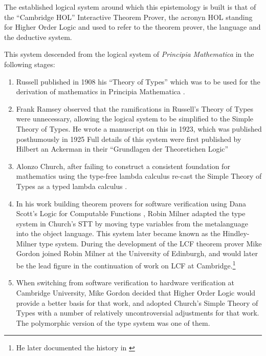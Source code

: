 \documentclass[10pt,titlepage]{book}
\begin{document}
The established logical system around which this epistemology is built is that of the ``Cambridge HOL'' Interactive Theorem Prover, the acronyn HOL standing for Higher Order Logic and used to refer to the theorem prover, the language and the deductive system.

This system descended from the logical system of \emph{Principia Mathematica} in the following stages:

\begin{enumerate}
\item Russell published in 1908 his ``Theory of Types'' \cite{russell1908,heijenoort67} which was to be used for the derivation of mathematics in Principia Mathematica \cite{russell1913}.
\item Frank Ramsey observed that the ramifications in Russell's Theory of Types were unnecessary, allowing the logical system to be simplified to the Simple Theory of Types.
  He wrote a manuscript on this in 1923, which was published posthumously in 1925 \cite{ramsey25,ramsey1931}
  Full details of this system were first published by Hilbert an Ackerman in their ``Grundlagen der Theoretichen Logic'' \cite{hilbert1928}
\item Alonzo Church, after failing to construct a consistent foundation for mathematics using the type-free lambda calculus re-cast the Simple Theory of Types as a typed lambda calculus \cite{churchSTT}.
\item In his work building theorem provers for software verification using Dana Scott's Logic for Computable Functions \cite{scott1993type}, Robin Milner adapted the type system in Church's STT by moving type variables from the metalanguage into the object language.
  This system later became known as the Hindley-Milner type system.
  During the development of the LCF theorem prover Mike Gordon joined Robin Milner at the University of Edinburgh, and would later be the lead figure in the continuation of work on LCF at Cambridge.\footnote{He later documented the history in \cite{gordon2000lcf}}

\item When switching from software verification to hardware verification at Cambridge University, Mike Gordon decided that Higher Order Logic would provide a better basis for that work, and adopted Church's Simple Theory of Types with a number of relatively uncontroversial adjustments for that work.
  The polymorphic version of the type system was one of them.
\end{enumerate}
\end{document}
